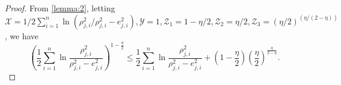 \documentclass[pdflatex,sn-mathphys-num]{sn-jnl}%
\theoremstyle{thmstyleone}%
\theoremstyle{thmstyletwo}%
\theoremstyle{thmstylethree}%
\begin{document}
\begin{proof}


			
From \cref{lemma:2}, letting $\mathcal{X} =1/2\sum_{i=1}^{n} \ln({\rho_{j,i}^2}/{\rho_{j,i}^2-e_{j,i}^2}), \mathcal{Y} =1, \mathcal{Z}_{1}= {1-{\eta}/{2}}, \mathcal{Z}_{2}={\eta}/{2}, \mathcal{Z}_{3}= (\eta/2)^{(\eta/(2-\eta))}$, we have
\begin{equation}\label{eq:59}
	\left(\frac{1}{2}\sum_{i=1}^{n} \ln\frac{\rho_{j,i}^2}{\rho_{j,i}^2-e_{j,i}^2}\right)^{1-\frac{\eta}{2}} \le \frac{1}{2} \sum_{i=1}^{n} \ln\frac{\rho_{j,i}^2}{\rho_{j,i}^2-e_{j,i}^2}+\left( 1-\frac{\eta}{2}\right) \left(\frac{\eta}{2}\right)^{\frac{\eta}{2-\eta}}.
\end{equation}


\end{proof}
\end{document}
